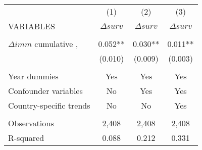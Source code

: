 \begin{tabular}{lccc} \hline
 & (1) & (2) & (3) \\
VARIABLES & $\Delta surv$ & $\Delta surv$ & $\Delta surv$ \\ \hline
 &  &  &  \\
$\Delta imm$ cumulative , & 0.052** & 0.030** & 0.011** \\
 & (0.010) & (0.009) & (0.003) \\
 &  &  &  \\
Year dummies & Yes &  Yes &  Yes \\
Confounder variables & No &  Yes &  Yes \\
Country-specific trends & No &  No &  Yes \\
 &  &  &  \\
Observations & 2,408 & 2,408 & 2,408 \\
 R-squared & 0.088 & 0.212 & 0.331 \\ \hline
\end{tabular}
